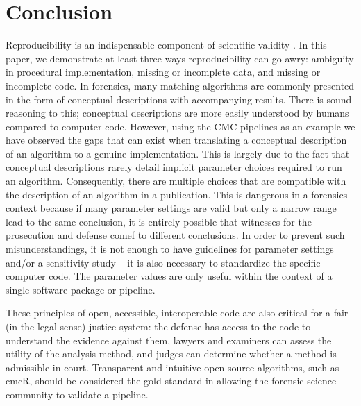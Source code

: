 \documentclass[11pt,]{isuthesis}
\begin{document}
\hypertarget{conclusion}{%
\section{Conclusion}\label{conclusion}}

Reproducibility is an indispensable component of scientific validity \citep{goodman_what_2016}.
In this paper, we demonstrate at least three ways reproducibility can go awry: ambiguity in procedural implementation, missing or incomplete data, and missing or incomplete code.
In forensics, many matching algorithms are commonly presented in the form of conceptual descriptions with accompanying results.
There is sound reasoning to this; conceptual descriptions are more easily understood by humans compared to computer code.
However, using the CMC pipelines as an example we have observed the gaps that can exist when translating a conceptual description of an algorithm to a genuine implementation.
This is largely due to the fact that conceptual descriptions rarely detail implicit parameter choices required to run an algorithm.
Consequently, there are multiple choices that are compatible with the description of an algorithm in a publication.
This is dangerous in a forensics context because if many parameter settings are valid but only a narrow range lead to the same conclusion, it is entirely possible that witnesses for the prosecution and defense comef to different conclusions.
In order to prevent such misunderstandings, it is not enough to have guidelines for parameter settings and/or a sensitivity study -- it is also necessary to standardize the specific computer code.
The parameter values are only useful within the context of a single software package or pipeline.

These principles of open, accessible, interoperable code are also critical for a fair (in the legal sense) justice system: the defense has access to the code to understand the evidence against them, lawyers and examiners can assess the utility of the analysis method, and judges can determine whether a method is admissible in court.
Transparent and intuitive open-source algorithms, such as cmcR, should be considered the gold standard in allowing the forensic science community to validate a pipeline.
\end{document}
